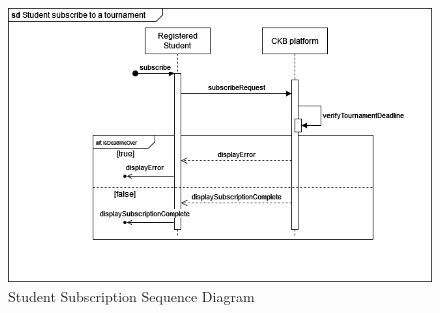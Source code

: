 \begin{center}
    \begin{figure} [H]
        \begin{center}
            \includegraphics[width=0.9\linewidth]{Images/SequenceDiagrams/SD_3.png}
            \caption{Student Subscription Sequence Diagram}
            \label{fig: student_subscription_seq_diag}
        \end{center}
    \end{figure}
\end{center}
\newpage
